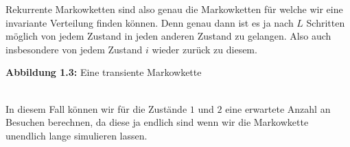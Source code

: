 \documentclass[a4paper]{article}
\begin{document}
Rekurrente Markowketten sind also genau die Markowketten für welche wir eine invariante Verteilung finden
können. Denn genau dann ist es ja nach $L$ Schritten möglich von jedem Zustand in jeden anderen Zustand
zu gelangen. Also auch insbesondere von jedem Zustand $i$ wieder zurück zu diesem.

\begin{center}
\end{center}
\qquad \caption{\textbf{Abbildung 1.3:}  Eine transiente Markowkette}
\\

In diesem Fall können wir für die Zustände $1$ und $2$ eine erwartete Anzahl an Besuchen berechnen,
da diese ja endlich sind wenn wir die Markowkette unendlich lange simulieren lassen.
\end{document}

